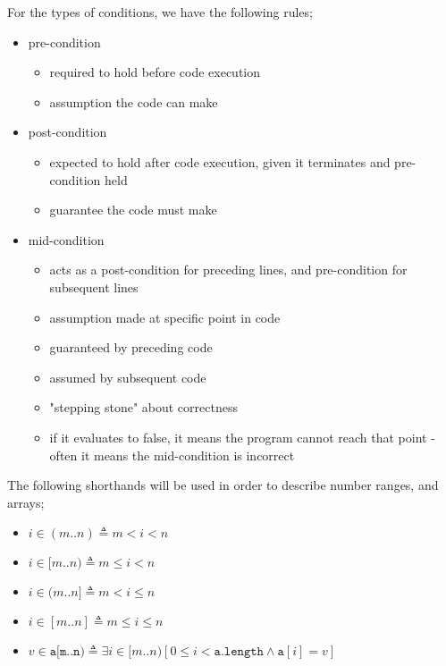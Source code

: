 \documentclass[a4paper, 12pt]{article}
\begin{document}
                For the types of conditions, we have the following rules;
                \begin{itemize}
                    \itemsep0em
                    \item pre-condition
                        \begin{itemize}
                            \itemsep0em
                            \item required to hold before code execution
                            \item assumption the code can make
                        \end{itemize}
                    \item post-condition
                        \begin{itemize}
                            \itemsep0em
                            \item expected to hold after code execution, given it terminates and pre-condition held
                            \item guarantee the code must make
                        \end{itemize}
                    \item mid-condition
                        \begin{itemize}
                            \itemsep0em
                            \item acts as a post-condition for preceding lines, and pre-condition for subsequent lines
                            \item assumption made at specific point in code
                            \item guaranteed by preceding code
                            \item assumed by subsequent code
                            \item "stepping stone" about correctness
                            \item if it evaluates to false, it means the program cannot reach that point - often it means the mid-condition is incorrect
                        \end{itemize}
                \end{itemize}
                The following shorthands will be used in order to describe number ranges, and arrays;
                \begin{itemize}
                    \itemsep0em
                    \item $i \in (m..n) \triangleq m < i < n$
                    \item $i \in [m..n) \triangleq m \leq i < n$
                    \item $i \in (m..n] \triangleq m < i \leq n$
                    \item $i \in [m..n] \triangleq m \leq i \leq n$
                    \item $v \in \texttt{a[m..n)} \triangleq \exists i \in [m..n) [0 \leq i < \texttt{a.length} \land \texttt{a}[i] = v]$
                \end{itemize}
\end{document}
